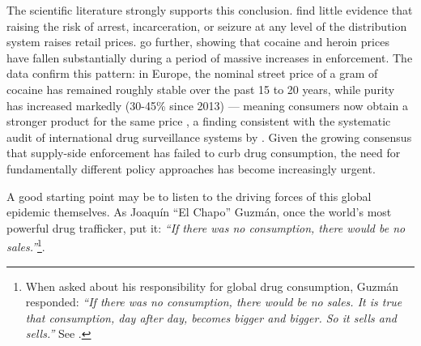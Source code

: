 \documentclass[12pt, a4paper]{article}
\begin{document}
\noindent The scientific literature strongly supports this conclusion. \citet{pollack_reuter_2014} find little evidence that raising the risk of arrest, incarceration, or seizure at any level of the distribution system raises retail prices. \citet{caulkins_reuter_taylor_2006} go further, showing that cocaine and heroin prices have fallen substantially during a period of massive increases in enforcement. The data confirm this pattern: in Europe, the nominal street price of a gram of cocaine has remained roughly stable over the past 15 to 20 years, while purity has increased markedly (30-45\% since 2013) --- meaning consumers now obtain a stronger product for the same price \citep{euda_europol_cocaine_2022}, a finding consistent with the systematic audit of international drug surveillance systems by \citet{werb_2011_violence}. Given the growing consensus that supply-side enforcement has failed to curb drug consumption, the need for fundamentally different policy approaches has become increasingly urgent. 

\noindent A good starting point may be to listen to the driving forces of this global epidemic themselves. As Joaqu\'{i}n ``El Chapo'' Guzm\'{a}n, once the world's most powerful drug trafficker, put it: \textit{``If there was no consumption, there would be no 
sales.''}\footnote{When asked about his responsibility for global drug consumption, Guzm\'{a}n responded: \textit{``If there was no consumption, there would be no sales. It is true that consumption, day after day, becomes bigger and bigger. So it sells and sells.''} 
See \citet{penn_elchapo_2016}.}. 
\end{document}
